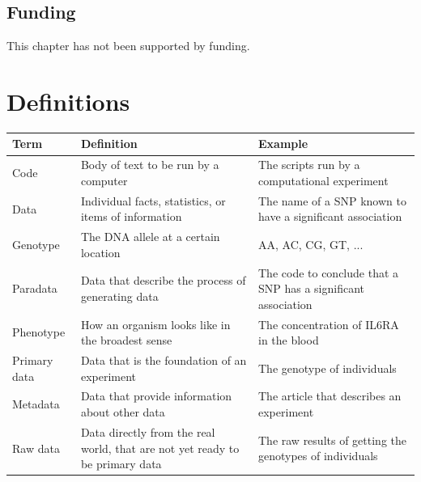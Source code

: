 \subsection{Funding}

This chapter has not been supported by funding.

\section*{Definitions}

\begin{table}[h]
  \begin{tabular}{|l|p{5cm}|p{5cm}|}
    \hline
    Term         & Definition                                                                   & Example                                                         \\
    \hline
    Code         & Body of text to be run by a computer                                         & The scripts run by a computational experiment                   \\
    Data         & Individual facts, statistics, or items of information                        & The name of a SNP known to have a significant association       \\
    Genotype     & The DNA allele at a certain location                                         & AA, AC, CG, GT, ...                                             \\
    Paradata     & Data that describe the process of generating data                            & The code to conclude that a SNP has a significant association   \\
    Phenotype    & How an organism looks like in the broadest sense                             & The concentration of IL6RA in the blood                         \\
    Primary data & Data that is the foundation of an experiment                                 & The genotype of individuals                                     \\
    Metadata     & Data that provide information about other data                               & The article that describes an experiment                        \\
    Raw data     & Data directly from the real world, that are not yet ready to be primary data & The raw results of getting the genotypes of individuals         \\

\end{tabular}
\end{table}
